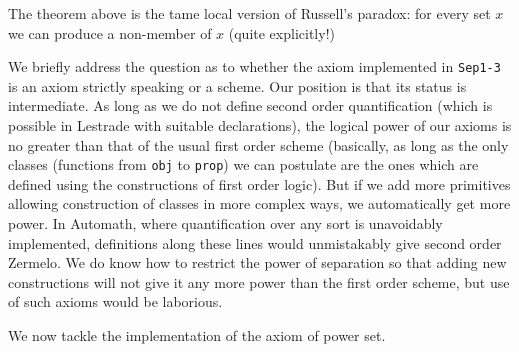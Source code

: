 \documentclass{article}
\begin{document}
The theorem above is the tame local version of Russell's paradox:  for every set $x$ we can produce a non-member of $x$ (quite explicitly!)

We briefly address the question as to whether the axiom implemented in {\tt Sep1-3} is an axiom strictly speaking or a scheme.  Our position is that its status is intermediate.
As long as we do not define second order quantification (which is possible in Lestrade with suitable declarations), the logical power of our axioms is no greater than that of the usual first order scheme (basically, as long as the only classes (functions from {\tt obj} to {\tt prop}) we can postulate are the ones which are defined using the constructions of first order logic).  But if we add more primitives allowing construction of classes in more complex ways, we automatically get more power.  In Automath, where quantification over any sort is unavoidably implemented,  definitions along these lines would unmistakably give second order Zermelo.  We do know how to restrict the power of separation so that adding new constructions will not give it any more power than the first order scheme, but use of such axioms would be laborious.

We now tackle the implementation of the axiom of power set.
\end{document}
